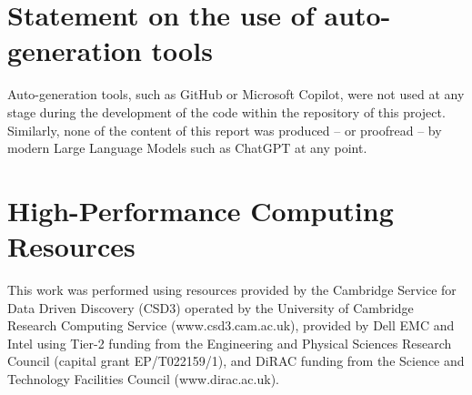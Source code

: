 \documentclass[12pt]{article}
\begin{document}



\appendix

\section{Statement on the use of auto-generation tools}

Auto-generation tools, such as GitHub or Microsoft Copilot, were not used at any stage during the development of the code within the repository of this project.
Similarly, none of the content of this report was produced -- or proofread -- by modern Large Language Models such as ChatGPT at any point.

\section {High-Performance Computing Resources}

This work was performed using resources provided by the Cambridge Service for Data Driven Discovery (CSD3) operated by the University of Cambridge Research Computing Service (www.csd3.cam.ac.uk),
provided by Dell EMC and Intel using Tier-2 funding from the Engineering and Physical Sciences Research Council (capital grant EP/T022159/1),
and DiRAC funding from the Science and Technology Facilities Council (www.dirac.ac.uk).
\end{document}
